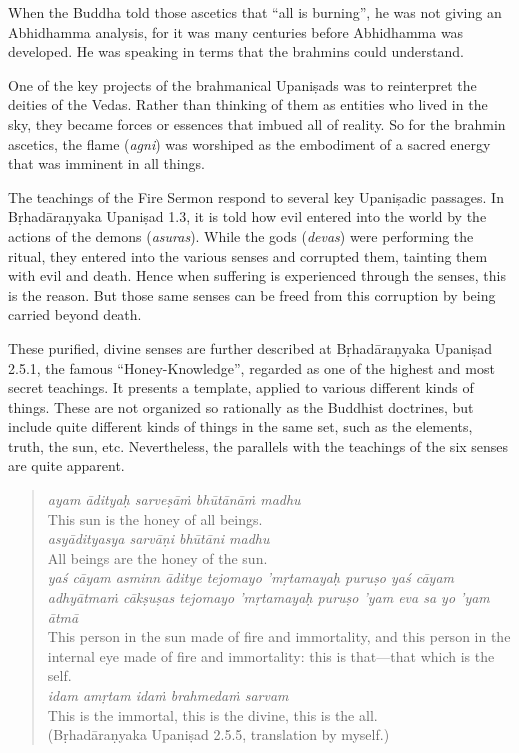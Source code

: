 \documentclass[12pt,openany]{book}%
\begin{document}
When the Buddha told those ascetics that “all is burning”, he was not giving an Abhidhamma analysis, for it was many centuries before Abhidhamma was developed. He was speaking in terms that the brahmins could understand.

One of the key projects of the brahmanical \textsanskrit{Upaniṣads} was to reinterpret the deities of the Vedas. Rather than thinking of them as entities who lived in the sky, they became forces or essences that imbued all of reality. So for the brahmin ascetics, the flame (\textit{agni}) was worshiped as the embodiment of a sacred energy that was imminent in all things.

The teachings of the Fire Sermon respond to several key \textsanskrit{Upaniṣadic} passages. In \textsanskrit{Bṛhadāraṇyaka} \textsanskrit{Upaniṣad} 1.3, it is told how evil entered into the world by the actions of the demons (\textit{asuras}). While the gods (\textit{devas}) were performing the ritual, they entered into the various senses and corrupted them, tainting them with evil and death. Hence when suffering is experienced through the senses, this is the reason. But those same senses can be freed from this corruption by being carried beyond death.

These purified, divine senses are further described at \textsanskrit{Bṛhadāraṇyaka} \textsanskrit{Upaniṣad} 2.5.1, the famous “Honey-Knowledge”, regarded as one of the highest and most secret teachings. It presents a template, applied to various different kinds of things. These are not organized so rationally as the Buddhist doctrines, but include quite different kinds of things in the same set, such as the elements, truth, the sun, etc. Nevertheless, the parallels with the teachings of the six senses are quite apparent.

\begin{quotation}%
\textit{ayam \textsanskrit{ādityaḥ} \textsanskrit{sarveṣāṁ} \textsanskrit{bhūtānāṁ} madhu} \\
This sun is the honey of all beings. \\
\textit{\textsanskrit{asyādityasya} \textsanskrit{sarvāṇi} \textsanskrit{bhūtāni} madhu} \\
All beings are the honey of the sun. \\
\textit{\textsanskrit{yaś} \textsanskrit{cāyam} asminn \textsanskrit{āditye} tejomayo ’\textsanskrit{mṛtamayaḥ} \textsanskrit{puruṣo} \textsanskrit{yaś} \textsanskrit{cāyam} \textsanskrit{adhyātmaṁ} \textsanskrit{cākṣuṣas} tejomayo ’\textsanskrit{mṛtamayaḥ} \textsanskrit{puruṣo} ’yam eva sa yo ’yam \textsanskrit{ātmā}} \\
This person in the sun made of fire and immortality, and this person in the internal eye made of fire and immortality: this is that—that which is the self. \\
\textit{idam \textsanskrit{amṛtam} \textsanskrit{idaṁ} \textsanskrit{brahmedaṁ} sarvam} \\
This is the immortal, this is the divine, this is the all. \\
(\textsanskrit{Bṛhadāraṇyaka} \textsanskrit{Upaniṣad} 2.5.5, translation by myself.)

%
\end{quotation}
\end{document}

